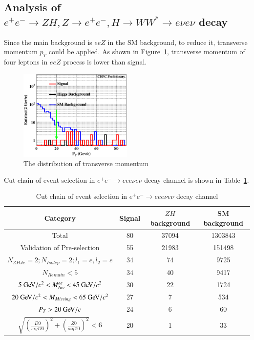 \documentclass[11pt,a4paper]{cepcnote}
\begin{document}
\subsection{Analysis of $e^+e^- \to ZH, Z \to e^+e^-, H\to WW^* \to e\nu e\nu$ decay}
Since the main background is $eeZ$ in the SM background, to reduce it, transverse momentum $p_T$ could be applied. 
As shown in Figure~\ref{fig:ptineeevev}, transverse momentum of four leptons in $eeZ$ process is lower than signal.
\begin{figure}[H]
	\centering
	\includegraphics[width=0.5\textwidth]{e1e1H/evev/ptineeevev}
	\caption[]{The distribution of transverse momentum}
	\label{fig:ptineeevev}
\end{figure}
Cut chain of event selection in $e^+e^- \to eee\nu e\nu$ decay channel is shown in Table~\ref{tab:cutchainofeeevev}.
\begin{table}[H]
  \begin{center}
    \begin{tabular}{cccc}
      \hline \hline
      \multicolumn{1}{c}{Category}&\multicolumn{1}{c}{Signal}&\multicolumn{1}{c}{$ZH$ background}&\multicolumn{1}{c}{SM background}\\ 
      \hline
      Total		       	 									&     80  	& 37094	&	1303843	\\
	  Validation of Pre-selection							&	  55	& 21983	&	151498	\\
      $N_{ZPole}=2; N_{Isolep}=2; l_1 = e, l_2 = e$	 		&     34    &   74	& 	9725	\\
	  $N_{Remain} < 5$										&	  34	&	40	& 	9417	\\
	  $5\gev/c^2 < M_{Inv}^{ee} < 45\gev/c^2$	        	&     30    &   22  & 	1724	\\
	  $20\gev/c^2 < M_{Missing} < 65\gev/c^2$	        	&     27    &   7   & 	534		\\
	  $P_{T} > 20\gev/c$									&	  24	&	6	& 	60		\\
	  $\sqrt{(\frac{D0}{sigD0})^2+(\frac{Z0}{sigZ0})^2} < 6$&     20    &   1   &   33		\\
      \hline \hline
    \end{tabular}
   \caption[]{Cut chain of event selection in $e^+e^- \to eee\nu e\nu$ decay channel}
  \label{tab:cutchainofeeevev}
 \end{center}
\end{table}
\end{document}
